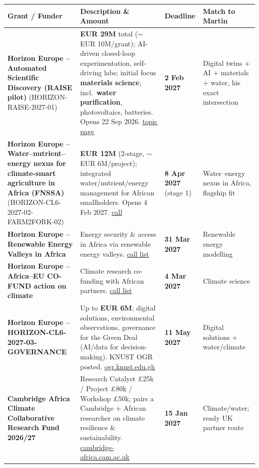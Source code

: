 \documentclass[11pt,a4paper]{article}
\begin{document}
\begin{longtable}{@{}p{3.3cm}p{5.6cm}p{2.2cm}p{2.8cm}@{}}
\toprule
\textbf{Grant / Funder} & \textbf{Description \& Amount} & \textbf{Deadline} & \textbf{Match to Martin} \\
\midrule
\endhead
\textbf{Horizon Europe -- Automated Scientific Discovery (RAISE pilot)} (HORIZON-RAISE-2027-01) & \textbf{EUR 29M} total ($\sim$EUR 10M/grant); AI-driven closed-loop experimentation, self-driving labs; initial focus \textbf{materials science}, incl.\ \textbf{water purification}, photovoltaics, batteries. Opens 22 Sep 2026. \href{https://topictree.ideal-ist.eu/topic/6992}{topic page} & \textbf{2 Feb 2027} & Digital twins $+$ AI $+$ materials $+$ water, his exact intersection \\
\midrule
\textbf{Horizon Europe -- Water--nutrient--energy nexus for climate-smart agriculture in Africa (FNSSA)} (HORIZON-CL6-2027-02-FARM2FORK-02) & \textbf{EUR 12M} (2-stage, $\sim$EUR 6M/project); integrated water/nutrient/energy management for African smallholders. Opens 4 Feb 2027. \href{https://www.horizon-europe.gouv.fr/optimising-water-nutrient-energy-nexus-sustainable-and-climate-smart-agriculture-africa-fnssa-41643}{call} & \textbf{8 Apr 2027} (stage 1) & Water--energy nexus in Africa, flagship fit \\
\midrule
\textbf{Horizon Europe -- Renewable Energy Valleys in Africa} & Energy security \& access in Africa via renewable energy valleys. \href{https://www.africaeuropeinnovation.net/fr/opportunites-de-financement/}{call list} & \textbf{31 Mar 2027} & Renewable energy modelling \\
\midrule
\textbf{Horizon Europe -- Africa--EU CO-FUND action on climate} & Climate research co-funding with African partners. \href{https://www.africaeuropeinnovation.net/fr/opportunites-de-financement/}{call list} & \textbf{4 Mar 2027} & Climate science \\
\midrule
\textbf{Horizon Europe -- HORIZON-CL6-2027-03-GOVERNANCE} & Up to \textbf{EUR 6M}; digital solutions, environmental observations, governance for the Green Deal (AI/data for decision-making). KNUST OGR posted. \href{https://ogr.knust.edu.gh/funding/horizon-cl6-2027-03-governance-innovative-governance-environmental-observations-and-digital}{ogr.knust.edu.gh} & \textbf{11 May 2027} & Digital solutions $+$ water/climate \\
\midrule
\textbf{Cambridge Africa Climate Collaborative Research Fund 2026/27} & Research Catalyst \pounds25k / Project \pounds80k / Workshop \pounds50k; pairs a Cambridge $+$ African researcher on climate resilience \& sustainability. \href{https://www.cambridge-africa.cam.ac.uk/initiatives/2026-call-for-applications/}{cambridge-africa.cam.ac.uk} & \textbf{15 Jan 2027} & Climate/water; ready UK partner route \\

\end{longtable}
\end{document}
